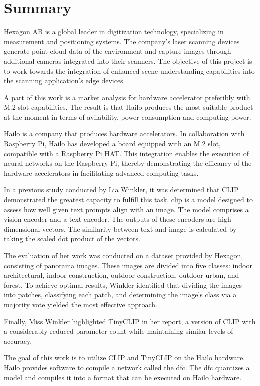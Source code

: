 \chapter*{Summary}
Hexagon AB is a global leader in digitization technology, specializing in measurement and positioning systems.  
The company's laser scanning devices generate point cloud data of the environment and capture images through additional cameras integrated into their scanners.  
The objective of this project is to work towards the integration of enhanced scene understanding capabilities into the scanning application's edge devices.

A part of this work is a market analysis for hardware accelerator preferibly with M.2 slot capabilities.
The result is that Hailo produces the most suitable product at the moment in terms of avilability, power consumption and computing power.

Hailo is a company that produces hardware accelerators.  
In collaboration with Raspberry Pi, Hailo has developed a board equipped with an M.2 slot, compatible with a Raspberry Pi HAT.  
This integration enables the execution of neural networks on the Raspberry Pi, thereby demonstrating the efficancy of the hardware accelerators in facilitating advanced computing tasks.\hfill\break

In a previous study conducted by Lia Winkler, it was determined that CLIP demonstrated the greatest capacity to fulfill this task.  
\acrfull{clip} is a model designed to assess how well given text prompts align with an image.  
The model comprises a vision encoder and a text encoder.  
The outputs of these encoders are high-dimensional vectors.  
The similarity between text and image is calculated by taking the scaled dot product of the vectors.  

The evaluation of her work was conducted on a dataset provided by Hexagon, consisting of panorama images.  
These images are divided into five classes: indoor architectural, indoor construction, outdoor construction, outdoor urban, and forest.  
To achieve optimal results, Winkler identified that dividing the images into patches, classifying each patch, and determining the image's class via a majority vote yielded the most effective approach.  

Finally, Miss Winkler highlighted TinyCLIP in her report, a version of CLIP with a considerably reduced parameter count while maintaining similar levels of accuracy.  \hfill\break

The goal of this work is to utilize CLIP and TinyCLIP on the Hailo hardware.  
Hailo provides software to compile a network called the \acrfull{dfc}.  
The \acrshort{dfc} quantizes a model and compiles it into a format that can be executed on Hailo hardware.  

